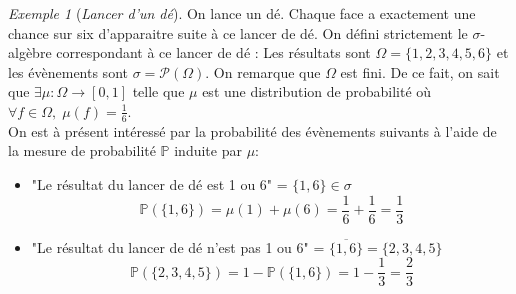 \documentclass[12pt,a4paper]{report}
\theoremstyle{definition}
\theoremstyle{remark}
\newtheorem{example}{Exemple}[chapter]
\newcommand{\ie}{\textit{i.e.}, }
\newcommand{\pr}{\mathbb{P}}
\let\labelitemi\labelitemii
\begin{document}
\begin{example}[\textit{Lancer d'un dé}]
	On lance un dé. Chaque face a exactement une chance sur six d'apparaitre suite à ce lancer de dé. On défini strictement le $\sigma$-algèbre correspondant à ce lancer de dé : 
	Les résultats sont $\Omega = \{1, 2, 3, 4, 5, 6\}$ et les évènements sont $\sigma = \mathcal{P}(\Omega)$.
	On remarque que $\Omega$ est fini.
	De ce fait, on sait que $\exists \mu: \Omega \rightarrow [0,1]$ telle que $\mu$ est une distribution de probabilité
	où $\forall f \in \Omega, \; \mu(f) = \frac{1}{6}$.\\
	On est à présent intéressé par la probabilité des évènements suivants à l'aide de la mesure de probabilité $\pr$ induite par $\mu$:
	\begin{itemize}
		\renewcommand{\labelitemi}{\tiny$\bullet$}
		\item "Le résultat du lancer de dé est 1 ou 6" = $\{1, 6\} \in \sigma$
		\[\pr(\{1,6\}) = \mu(1) + \mu(6) = \frac{1}{6} + \frac{1}{6} = \frac{1}{3}\]
		\item "Le résultat du lancer de dé n'est pas 1 ou 6" = $\overline{\{1, 6\}} = \{2, 3, 4, 5\}$
		\[\pr(\{2, 3, 4, 5\}) = 1 - \pr(\{1, 6\}) = 1 - \frac{1}{3} = \frac{2}{3}\]
	\end{itemize}
\end{example}

\end{document}
